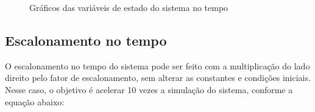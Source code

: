 \documentclass[12pt]{article}
\begin{document}
\begin{figure}[H]
         \qquad
         \par
        \caption{Gráficos das variáveis de estado do sistema no tempo}        
    \end{figure}

    \subsection{Escalonamento no tempo}
    O escalonamento no tempo do sistema pode ser feito com a multiplicação do lado direito pelo fator de escalonamento, sem alterar as constantes e condições iniciais. Nesse caso, o objetivo é acelerar 10 vezes a simulação do sistema, conforme a equação abaixo:
    
\end{document}
